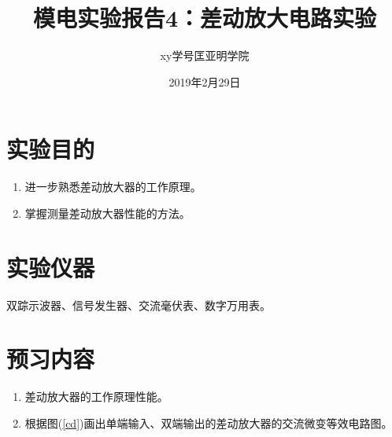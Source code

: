\documentclass[a4paper]{article}
\title{模电实验报告4：差动放大电路实验}
\author{xy\quad 学号\quad 匡亚明学院}
\date{2019年2月29日}
\begin{document}
\maketitle


\section{实验目的}
\begin{enumerate}
\item 进一步熟悉差动放大器的工作原理。
\item 掌握测量差动放大器性能的方法。
\end{enumerate}

\section{实验仪器}
双踪示波器、信号发生器、交流毫伏表、数字万用表。

\section{预习内容}
\begin{enumerate}
\item 差动放大器的工作原理性能。
\item 根据图(\ref{cd})画出单端输入、双端输出的差动放大器的交流微变等效电路图。
\end{enumerate}
\end{document}
